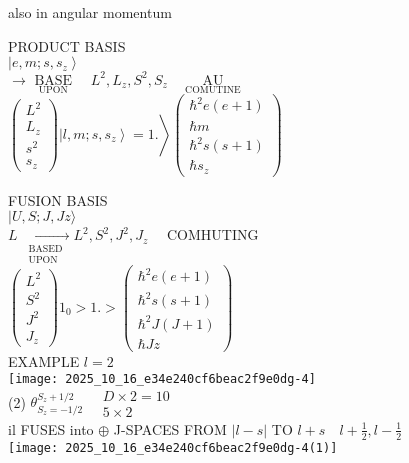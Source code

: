 also in angular momentum

PRODUCT BASIS\\
$\left|e, m ; s, s_{z}\right\rangle$\\
$\rightarrow \underset{\text { UPON }}{\text { BASE }} \quad L^{2}, L_{z}, S^{2}, S_{z} \quad \underset{\text { COMUTINE }}{\text { AU }}$\\
$\left.\left(\begin{array}{l}L^{2} \\ L_{z} \\ s^{2} \\ s_{z}\end{array}\right)\left|l, m ; s, s_{z}\right\rangle=1.\right\rangle\left(\begin{array}{c}\hbar^{2} e(e+1) \\ \hbar m \\ \hbar^{2} s(s+1) \\ \hbar s_{z}\end{array}\right)$

FUSION BASIS\\
$|U, S ; J, J z\rangle$\\
$L \xrightarrow[\substack{\text { BASED } \\ \text { UPON }}]{ } L^{2}, S^{2}, J^{2}, J_{z} \quad$ COMHUTING\\
$\left(\begin{array}{l}L^{2} \\ S^{2} \\ J^{2} \\ J_{z}\end{array}\right) 1_{0}>1 .>\left(\begin{array}{c}\hbar^{2} e(e+1) \\ \hbar^{2} s(s+1) \\ \hbar^{2} J(J+1) \\ \hbar J z\end{array}\right)$\\
EXAMPLE $l=2$\\
\texttt{[image: 2025\_10\_16\_e34e240cf6beac2f9e0dg-4]}\\
(2) $\theta_{S_{z}=-1 / 2}^{S_{z}+1 / 2} \quad \begin{gathered}D \times 2=10 \\ 5 \times 2\end{gathered}$\\
il FUSES into $\oplus$ J-SPACES FROM $|l-s|$ TO $l+s \quad l+\frac{1}{2}, l-\frac{1}{2}$\\
\texttt{[image: 2025\_10\_16\_e34e240cf6beac2f9e0dg-4(1)]}

